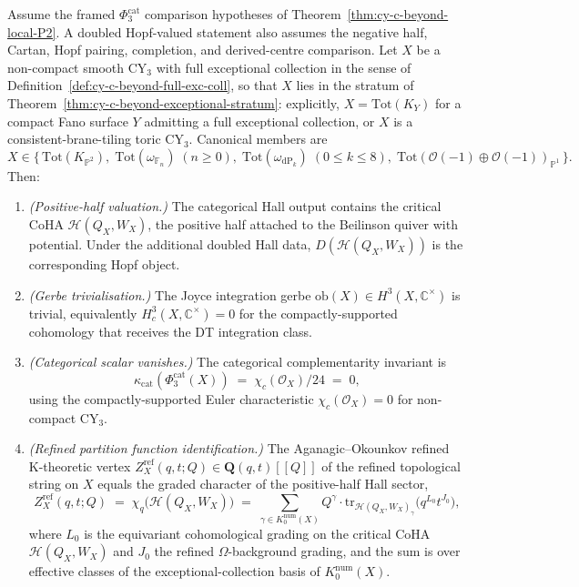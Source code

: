 \begin{theorem}
\label{thm:cy-c-beyond-noncompact-aganagic-okounkov}
Assume the framed $\Phi_3^{\mathrm{cat}}$ comparison hypotheses of
Theorem~\ref{thm:cy-c-beyond-local-P2}. A doubled Hopf-valued statement
also assumes the negative half, Cartan, Hopf pairing, completion, and
derived-centre comparison.
Let $X$ be a non-compact smooth CY$_3$ with full exceptional
collection in the sense of
Definition~\ref{def:cy-c-beyond-full-exc-coll}, so that $X$ lies in
the stratum of Theorem~\ref{thm:cy-c-beyond-exceptional-stratum}:
explicitly, $X = \mathrm{Tot}(K_Y)$ for a compact Fano surface $Y$ admitting
a full exceptional collection, or $X$ is a consistent-brane-tiling
toric CY$_3$. Canonical members are
\[
 X \in \bigl\{\,
 \mathrm{Tot}(K_{\mathbb P^2}),\;
 \mathrm{Tot}(\omega_{\mathbb F_n})\; (n \geq 0),\;
 \mathrm{Tot}(\omega_{\mathrm{dP}_k})\; (0 \leq k \leq 8),\;
 \mathrm{Tot}(\mathcal O(-1) \oplus \mathcal O(-1))_{\mathbb P^1}
 \,\bigr\}.
\]
Then:
\begin{enumerate}[label=\textup{(\roman*)}]
 \item \emph{(Positive-half valuation.)} The categorical Hall output
 contains the critical CoHA
 \(\mathcal H(Q_X,W_X)\), the positive half attached to the Beilinson
 quiver with potential. Under the additional doubled Hall data,
 \(D(\mathcal H(Q_X,W_X))\) is the corresponding Hopf object.
 \item \emph{(Gerbe trivialisation.)} The Joyce integration gerbe
 $\mathrm{ob}(X) \in H^3(X, \mathbb C^\times)$ is trivial,
 equivalently $H^3_c(X, \mathbb C^\times) = 0$ for the
 compactly-supported cohomology that receives the DT
 integration class.
 \item \emph{(Categorical scalar vanishes.)} The categorical
 complementarity invariant is
 \[
 \kappa_{\mathrm{cat}}(\Phi_3^{\mathrm{cat}}(X))
 \;=\; \chi_c(\mathcal O_X)/24 \;=\; 0,
 \]
 using the compactly-supported Euler characteristic
 $\chi_c(\mathcal O_X) = 0$ for non-compact CY$_3$.
 \item \emph{(Refined partition function identification.)} The
 Aganagic--Okounkov refined K-theoretic vertex
 $Z^{\mathrm{ref}}_X(q, t; Q) \in \mathbf Q(q, t)[[Q]]$ of
 the refined topological string on $X$ equals the graded
 character of the positive-half Hall sector,
 \[
 Z^{\mathrm{ref}}_X(q, t; Q)
 \;=\;
 \chi_q\!\bigl(\mathcal H(Q_X,W_X)\bigr)
 \;=\;
 \sum_{\gamma \in K_0^{\mathrm{num}}(X)} Q^\gamma
 \cdot \mathrm{tr}_{\mathcal H(Q_X, W_X)_\gamma}\!\bigl(q^{L_0} t^{J_0}\bigr),
 \]
 where $L_0$ is the equivariant cohomological grading on
 the critical CoHA $\mathcal H(Q_X, W_X)$ and $J_0$ the
 refined $\Omega$-background grading, and the sum is over
 effective classes of the exceptional-collection basis of
 $K_0^{\mathrm{num}}(X)$.
\end{enumerate}
\end{theorem}


